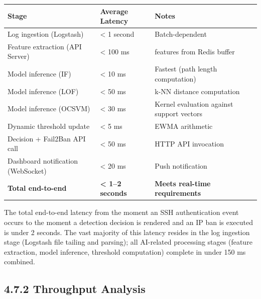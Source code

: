 \documentclass[
  a4paper]{report}
\newcounter{none} %
\begin{document}
{\def\LTcaptype{none} %
\begin{longtable}[]{@{}
  >{\raggedright\arraybackslash}p{}
  >{\raggedright\arraybackslash}p{}
  >{\raggedright\arraybackslash}p{}@{}}
\toprule\noalign{}
\begin{minipage}[b]{\linewidth}\raggedright
Stage
\end{minipage} & \begin{minipage}[b]{\linewidth}\raggedright
Average Latency
\end{minipage} & \begin{minipage}[b]{\linewidth}\raggedright
Notes
\end{minipage} \\
\midrule\noalign{}
\endhead
\bottomrule\noalign{}
\endlastfoot
Log ingestion (Logstash) & \textless{} 1 second & Batch-dependent \\
Feature extraction (API Server) & \textless{} 100 ms & 14 features from
Redis buffer \\
Model inference (IF) & \textless{} 10 ms & Fastest (path length
computation) \\
Model inference (LOF) & \textless{} 50 ms & k-NN distance computation \\
Model inference (OCSVM) & \textless{} 30 ms & Kernel evaluation against
support vectors \\
Dynamic threshold update & \textless{} 5 ms & EWMA arithmetic \\
Decision + Fail2Ban API call & \textless{} 50 ms & HTTP API
invocation \\
Dashboard notification (WebSocket) & \textless{} 20 ms & Push
notification \\
\textbf{Total end-to-end} & \textbf{\textless{} 1--2 seconds} &
\textbf{Meets real-time requirements} \\
\end{longtable}
}

The total end-to-end latency from the moment an SSH authentication event
occurs to the moment a detection decision is rendered and an IP ban is
executed is under 2 seconds. The vast majority of this latency resides
in the log ingestion stage (Logstash file tailing and parsing); all
AI-related processing stages (feature extraction, model inference,
threshold computation) complete in under 150 ms combined.

\subsection{4.7.2 Throughput Analysis}\label{throughput-analysis}
\end{document}
